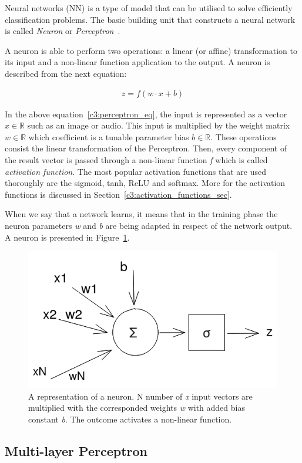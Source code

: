 Neural networks (NN) is a type of model that can be utilised to solve efficiently classification problems. The basic building unit that constructs a neural network is called \textit{Neuron} or \textit{Perceptron}~\cite{rosenblatt1958perceptron}.

A neuron is able to perform two operations: a linear (or affine) transformation to its input and a non-linear function application to the output. A neuron is described from the next equation:
\begin{ceqn}
\label{c3:perceptron_eq}
\begin{align}
    z = f(w \cdot x + b)
\end{align}
\end{ceqn}
In the above equation~\ref{c3:perceptron_eq}, the input is represented as a vector $x \in \mathbb{R}$ such as an image or audio. This input is multiplied by the weight matrix $w \in \mathbb{R}$ which coefficient is a tunable parameter bias $b \in \mathbb{R}$.
These operations consist the linear transformation of the Perceptron. 
Then, every component of the result vector is passed through a non-linear function \textit{f} which is called \textit{activation function}.
The most popular activation functions that are used thoroughly are the sigmoid, tanh, ReLU and softmax. More for the activation functions is discussed in Section~\ref{c3:activation_functions_sec}.

When we say that a network learns, it means that in the training phase the neuron parameters \textit{w} and \textit{b} are being adapted in respect of the network output. A neuron is presented in Figure~\ref{c3:perceptron}.

\begin{figure}[h!]
    \centering  
    \includegraphics[width=.5\textwidth]{figures/chap3/ml/neuron}
    \caption{A representation of a neuron. N number of \textit{x} input vectors are multiplied with the corresponded weights \textit{w} with added bias constant \textit{b}. The outcome activates a non-linear function.}
    \label{c3:perceptron}
\end{figure}

\subsection{Multi-layer Perceptron}

